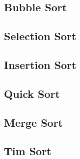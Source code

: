 \subsection{Bubble Sort}

\subsection{Selection Sort}

\subsection{Insertion Sort}

\subsection{Quick Sort}

\subsection{Merge Sort}

\subsection{Tim Sort}

